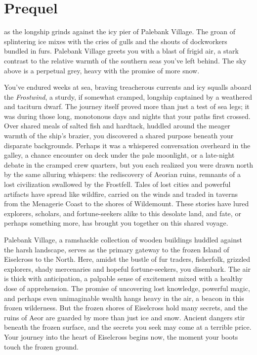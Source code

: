 \documentclass[
  letterpaper,12pt,twoside,twocolumn,openany,
  nodeprecatedcode,bg=full]{dndbook}
\author{}
\date{}
\begin{document}
\chapter{Prequel}\label{prequel}

 as the longship
grinds against the icy pier of Palebank Village. The groan of
splintering ice mixes with the cries of gulls and the shouts of
dockworkers bundled in furs. Palebank Village greets you with a blast of
frigid air, a stark contrast to the relative warmth of the southern seas
you've left behind. The sky above is a perpetual grey, heavy with the
promise of more snow.

You've endured weeks at sea, braving treacherous currents and icy
squalls aboard the \emph{Frostwind}, a sturdy, if somewhat cramped,
longship captained by a weathered and taciturn dwarf. The journey itself
proved more than just a test of sea legs; it was during those long,
monotonous days and nights that your paths first crossed. Over shared
meals of salted fish and hardtack, huddled around the meager warmth of
the ship's brazier, you discovered a shared purpose beneath your
disparate backgrounds. Perhaps it was a whispered conversation overheard
in the galley, a chance encounter on deck under the pale moonlight, or a
late-night debate in the cramped crew quarters, but you each realized
you were drawn north by the same alluring whispers: the rediscovery of
Aeorian ruins, remnants of a lost civilization swallowed by the
Frostfell. Tales of lost cities and powerful artifacts have spread like
wildfire, carried on the winds and traded in taverns from the Menagerie
Coast to the shores of Wildemount. These stories have lured explorers,
scholars, and fortune-seekers alike to this desolate land, and fate, or
perhaps something more, has brought you together on this shared voyage.

Palebank Village, a ramshackle collection of wooden buildings huddled
against the harsh landscape, serves as the primary gateway to the frozen
Island of Eiselcross to the North. Here, amidst the bustle of fur
traders, fisherfolk, grizzled explorers, shady mercenaries and hopeful
fortune-seekers, you disembark. The air is thick with anticipation, a
palpable sense of excitement mixed with a healthy dose of apprehension.
The promise of uncovering lost knowledge, powerful magic, and perhaps
even unimaginable wealth hangs heavy in the air, a beacon in this frozen
wilderness. But the frozen shores of Eiselcross hold many secrets, and
the ruins of Aeor are guarded by more than just ice and snow. Ancient
dangers stir beneath the frozen surface, and the secrets you seek may
come at a terrible price. Your journey into the heart of Eiselcross
begins now, the moment your boots touch the frozen ground.
\end{document}
